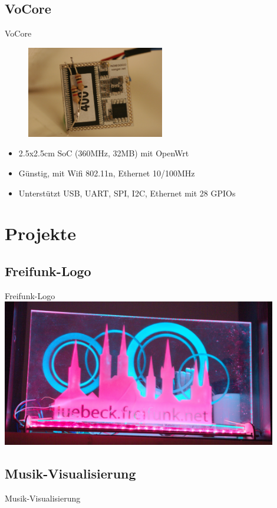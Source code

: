 \documentclass{beamer}
\begin{document}
\subsection{VoCore}
\begin{frame}{VoCore}
\begin{figure}[h]
 \centering
 \includegraphics[width=6cm,keepaspectratio=true]{./img/_MG_4492.JPG}
\end{figure}
\begin{itemize}
 \item 2.5x2.5cm SoC (360MHz, 32MB) mit OpenWrt
 \item Günstig, mit Wifi 802.11n, Ethernet 10/100MHz
 \item Unterstützt USB, UART, SPI, I2C, Ethernet mit 28 GPIOs
\end{itemize}
\end{frame}

\section{Projekte}
\subsection{Freifunk-Logo}
\begin{frame}{Freifunk-Logo}
 \centering
 \includegraphics[width=12cm,keepaspectratio=true]{./img/_MGL5102.jpg}
\end{frame}

\subsection{Musik-Visualisierung}
\begin{frame}{Musik-Visualisierung}
\end{frame}
\end{document}
